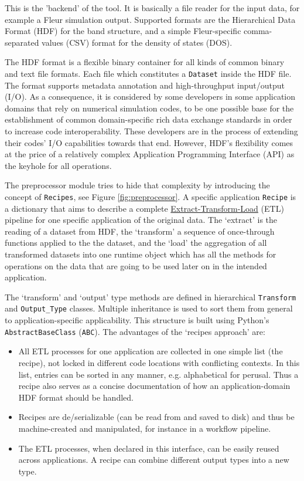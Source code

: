 This is the 'backend' of the tool. It is basically a file reader for the input
data, for example a Fleur simulation output. Supported formats are the
Hierarchical Data Format (HDF) \cite{hdf} for the band structure, and a simple
Fleur-specific comma-separated values (CSV) format for the density of states
(DOS).

The HDF format is a flexible binary container for all kinds of common binary and
text file formats. Each file which constitutes a \texttt{Dataset} inside the HDF
file. The format supports metadata annotation and high-throughput input/output
(I/O). As a consequence, it is considered by some developers in some application
domains that rely on numerical simulation codes, to be one possible base for the
establishment of common domain-specific rich data exchange standards in order to
increase code interoperability. These developers are in the process of extending
their codes' I/O capabilities towards that end. However, HDF's flexibility comes
at the price of a relatively complex Application Programming Interface (API) as
the keyhole for all operations.

The preprocessor module tries to hide that complexity by introducing the concept
of \texttt{Recipes}, see Figure \ref{fig:preprocessor}. A specific application
\texttt{Recipe} is a dictionary that aims to describe a complete
\href{https://en.wikipedia.org/wiki/Extract,_transform,_load}{Extract-Transform-Load}
(ETL) pipeline for one specific application of the original data. The `extract'
is the reading of a dataset from HDF, the `transform' a sequence of once-through
functions applied to the the dataset, and the `load' the aggregation of all
transformed datasets into one runtime object which has all the methods for
operations on the data that are going to be used later on in the intended
application.

The `transform' and `output' type methods are defined in hierarchical
\texttt{Transform} and \texttt{Output\_Type} classes. Multiple inheritance is
used to sort them from general to application-specific applicability. This
structure is built using Python's \texttt{AbstractBaseClass} (\texttt{ABC}). The
advantages of the `recipes approach' are:
\begin{itemize}
\item All ETL processes for one application are collected in one simple list
    (the recipe), not locked in different code locations with conflicting
    contexts. In this list, entries can be sorted in any manner, e.g.
    alphabetical for perusal. Thus a recipe also serves as a concise
    documentation of how an application-domain HDF format should be handled.
\item Recipes are de/serializable (can be read from and saved to disk) and thus be
    machine-created and manipulated, for instance in a workflow pipeline.
\item The ETL processes, when declared in this interface, can be easily reused
    across applications. A recipe can combine different output types into a new
    type.
\end{itemize}

